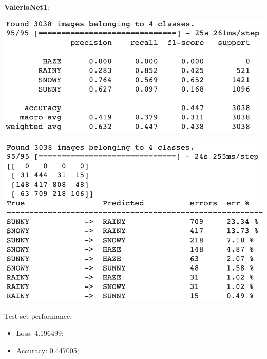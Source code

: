 \documentclass[12pt]{article}
\begin{document}
\bigskip
{\bf ValerioNet1}: \newline
\begin{minipage}[c]{.5\textwidth}
   \centering
   \includegraphics[width=\textwidth]{pic8}
\end{minipage}
\hspace{1em}
\begin{minipage}[c]{.5\textwidth}
   \centering
   \includegraphics[width=\textwidth]{pic9}
\end{minipage}

Test set performance:
\begin{itemize}
    \item Loss: 4.196499;
    \item Accuracy: 0.447005;
\end{itemize}
\end{document}

